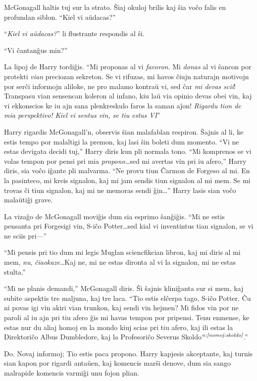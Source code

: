 McGonagall haltis tuj sur la strato. Ŝiaj okuloj brilis kaj ŝia voĉo
falis en profundan siblon. ``Kiel vi aŭdacas?''

``\emph{Kiel vi aŭdacas?}'' li flustrante respondis al ŝi.

``Vi ĉantanĝus min?''

La lipoj de Harry tordiĝis. ``Mi proponas al vi \emph{favoron}. Mi
\emph{donas} al vi ŝancon por protekti \emph{vian} preciozan
sekreton. Se vi rifuzas, mi havos ĉiujn naturajn motivojn por serĉi
informojn aliloke, ne pro malamo kontraŭ vi, sed ĉar \emph{mi devas
scii}! Transpasu vian sensencan koleron al infano, kiu laŭ via opinio
devas obei vin, kaj vi ekkonscios ke iu ajn sana plenkreskulo faros la
saman aĵon! \emph{Rigardu tion de mia perspektivo! Kiel vi sentus vin,
se tiu estus VI}''

Harry rigardis McGonagall'n, observis ŝian malafablan respiron. Ŝajnis
al li, ke estis tempo por malaltigi la premon, kaj lasi ŝin boleti dum
momento. ``Vi ne estas devigata decidi tuj,'' Harry diris kun pli
normala tono. ``Mi komprenos se vi volas tempon por pensi pri mia
\emph{propono}\ldots sed mi avertas vin pri iu afero,'' Harry diris,
sia voĉo iĝante pli malvarma. ``Ne provu tiun Ĉarmon de Forgeso al
mi. En la pasinteco, mi kreis signalon, kaj mi jam sendis tiun
signalon al mi mem. Se mi trovas ĉi tiun signalon, kaj mi ne memoras
sendi ĝin\ldots'' Harry lasis sian voĉo malaŭtiĝi grave.

La vizaĝo de McGonagall moviĝis dum sia esprimo ŝanĝiĝis. ``Mi ne
estis pensanta pri Forgesigi vin, S-iĉo Potter\ldots sed kial vi
inventintus tian signalon, se vi ne sciis pri—''

``Mi pensis pri tio dum mi legis Muglan sciencfikcian libron, kaj mi
diris al mi mem, \emph{nu}, \emph{ĉiaokaze}\ldots Kaj ne, mi ne estas
dironta al vi la signalon, mi ne estas stulta.''

``Mi ne planis demandi,'' McGonagall diris. Ŝi ŝajnis kliniĝanta sur
si mem, kaj subite aspektis tre maljuna, kaj tre laca. ``Tio estis
elĉerpa tago, S-iĉo Potter. Ĉu ni povas igi vin akiri vian trunkon,
kaj sendi vin hejmen? Mi fidos vin por ne paroli al iu ajn pri tiu
afero ĝis mi havas tempon por pripensi. Tenu enmense, ke estas nur du
aliaj homoj en la mondo kiuj scias pri tiu afero, kaj ili estas la
Direktoriĉo Albus Dumbledore, kaj la Profesoriĉo Severus
Skoldo$^{\textit{n:\ref{nomoj:skoldo}}}$.''

Do. Novaj informoj; Tio estis paca propono. Harry kapjesis akceptante,
kaj turnis sian kapon por rigardi antaŭen, kaj komencis marŝi denove,
dum sia sango malrapide komencis varmiĝi unu fojon plian.

